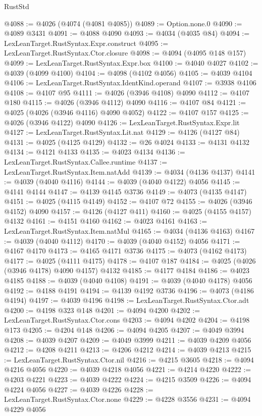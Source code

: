 \begin{lexlean}{RustStd}
\begin{coremodule}
@4088 := @4026 (@4074 (@4081 @4085))
@4089 := Option.none.{0}
@4090 := @4089 @3431
@4091 := @4088 @4090
@4093 := @4034 (@4035 @84)
@4094 := LexLeanTarget.RustSyntax.Expr.construct
@4095 := LexLeanTarget.RustSyntax.Ctor.closure
@4098 := @4094 (@4095 @148 @157)
@4099 := LexLeanTarget.RustSyntax.Expr.box
@4100 := @4040 @4027
@4102 := @4039 (@4099 @4100)
@4104 := @4098 (@4102 @4056)
@4105 := @4039 @4104
@4106 := LexLeanTarget.RustSyntax.IdentKind.operand
@4107 := @3938 @4106
@4108 := @4107 @95
@4111 := @4026 (@3946 @4108) @4090
@4112 := @4107 @180
@4115 := @4026 (@3946 @4112) @4090
@4116 := @4107 @84
@4121 := @4025 (@4026 (@3946 @4116) @4090 @4052)
@4122 := @4107 @157
@4125 := @4026 (@3946 @4122) @4090
@4126 := LexLeanTarget.RustSyntax.Expr.lit
@4127 := LexLeanTarget.RustSyntax.Lit.nat
@4129 := @4126 (@4127 @84)
@4131 := @4025 (@4125 @4129)
@4132 := @26 @4024
@4133 := @4131 @4132
@4134 := @4121 @4133
@4135 := @4023 @4134
@4136 := LexLeanTarget.RustSyntax.Callee.runtime
@4137 := LexLeanTarget.RustSyntax.Item.natAdd
@4139 := @4034 (@4136 @4137)
@4141 := @4039 (@4040 @4116)
@4144 := @4039 (@4040 @4122) @4056
@4145 := @4141 @4144
@4147 := @4139 @4145 @3736
@4149 := @4073 (@4135 @4147)
@4151 := @4025 (@4115 @4149)
@4152 := @4107 @72
@4155 := @4026 (@3946 @4152) @4090
@4157 := @4126 (@4127 @411)
@4160 := @4025 (@4155 @4157) @4132
@4161 := @4151 @4160
@4162 := @4023 @4161
@4163 := LexLeanTarget.RustSyntax.Item.natMul
@4165 := @4034 (@4136 @4163)
@4167 := @4039 (@4040 @4112)
@4170 := @4039 (@4040 @4152) @4056
@4171 := @4167 @4170
@4173 := @4165 @4171 @3736
@4175 := @4073 (@4162 @4173)
@4177 := @4025 (@4111 @4175)
@4178 := @4107 @187
@4184 := @4025 (@4026 (@3946 @4178) @4090 @4157) @4132
@4185 := @4177 @4184
@4186 := @4023 @4185
@4188 := @4039 (@4040 @4108)
@4191 := @4039 (@4040 @4178) @4056
@4192 := @4188 @4191
@4194 := @4139 @4192 @3736
@4196 := @4073 (@4186 @4194)
@4197 := @4039 @4196
@4198 := LexLeanTarget.RustSyntax.Ctor.adt
@4200 := @4198 @323 @148
@4201 := @4094 @4200
@4202 := LexLeanTarget.RustSyntax.Ctor.cons
@4203 := @4094 @4202
@4204 := @4198 @173
@4205 := @4204 @148
@4206 := @4094 @4205
@4207 := @4049 @3994
@4208 := @4039 @4207
@4209 := @4049 @3999
@4211 := @4039 @4209 @4056
@4212 := @4208 @4211
@4213 := @4206 @4212
@4214 := @4039 @4213
@4215 := LexLeanTarget.RustSyntax.Ctor.nil
@4216 := @4215 @3605
@4218 := @4094 @4216 @4056
@4220 := @4039 @4218 @4056
@4221 := @4214 @4220
@4222 := @4203 @4221
@4223 := @4039 @4222
@4224 := @4215 @3509
@4226 := @4094 @4224 @4056
@4227 := @4039 @4226
@4228 := LexLeanTarget.RustSyntax.Ctor.none
@4229 := @4228 @3556
@4231 := @4094 @4229 @4056

\end{coremodule}
\end{lexlean}
